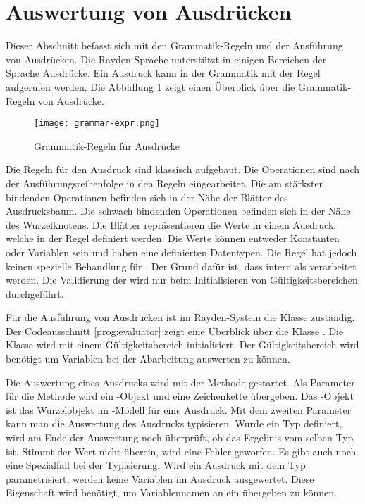 \clearpage

\section{Auswertung von Ausdrücken}
\label{cha:Eval}

Dieser Abschnitt befasst sich mit den Grammatik-Regeln und der Ausführung von Ausdrücken. Die Rayden-Sprache unterstützt in einigen Bereichen der Sprache Ausdrücke. Ein Ausdruck kann in der Grammatik mit der Regel  aufgerufen werden. Die Abbidlung \ref{fig:exprGrammar} zeigt einen Überblick über die Grammatik-Regeln von Ausdrücke. 

\begin{figure}
\centering
\texttt{[image: grammar-expr.png]}
\caption{Grammatik-Regeln für Ausdrücke}
\label{fig:exprGrammar}
\end{figure}

\SuperPar
Die Regeln für den Ausdruck sind klassisch aufgebaut. Die Operationen sind nach der Ausführungsreihenfolge in den Regeln eingearbeitet. Die am stärksten bindenden Operationen befinden sich in der Nähe der Blätter des Ausdrucksbaum. Die schwach bindenden Operationen befinden sich in der Nähe des Wurzelknotens. Die Blätter repräsentieren die Werte in einem Ausdruck, welche in der Regel  definiert werden. Die Werte können entweder Konstanten oder Variablen sein und haben eine definierten Datentypen. Die Regel  hat jedoch keinen spezielle Behandlung für . Der Grund dafür ist, dass  intern als  verarbeitet werden. Die Validierung der wird nur beim Initialisieren von Gültigkeitsbereichen durchgeführt.

\SuperPar
Für die Ausführung von Ausdrücken ist im Rayden-System die Klasse  zuständig. Der Codeausschnitt \ref{prog:evaluator} zeigt eine Überblick über die Klasse . Die Klasse wird mit einem Gültigkeitsbereich initialisiert. Der Gültigkeitsbereich wird benötigt um Variablen bei der Abarbeitung auswerten zu können. 

\SuperPar
Die Auswertung eines Ausdrucks wird mit der Methode  gestartet. Als Parameter für die Methode wird ein -Objekt und eine Zeichenkette übergeben. Das -Objekt ist das Wurzelobjekt im -Modell für eine Ausdruck. Mit dem zweiten Parameter kann man die Auswertung des Ausdrucks typisieren. Wurde ein Typ definiert, wird am Ende der Auswertung noch überprüft, ob das Ergebnis vom selben Typ ist. Stimmt der Wert nicht überein, wird eine Fehler geworfen. Es gibt auch noch eine Spezialfall bei der Typisierung. Wird ein Ausdruck mit dem Typ  parametrisiert, werden keine Variablen im Ausdruck ausgewertet. Diese Eigenschaft wird benötigt, um Variablennamen an ein  übergeben zu können.

